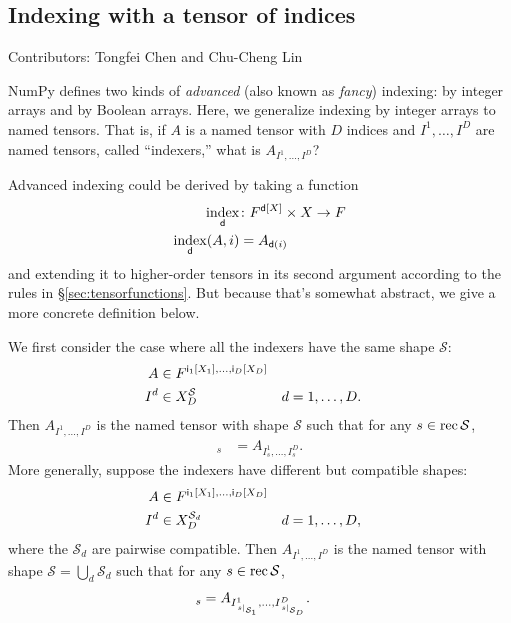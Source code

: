 \subsection{Indexing with a tensor of indices}

Contributors: Tongfei Chen and Chu-Cheng Lin

NumPy defines two kinds of \emph{advanced} (also known as \emph{fancy}) indexing: by integer arrays and by Boolean arrays. Here, we generalize indexing by integer arrays to named tensors. That is, if $A$ is a named tensor with $D$ indices and $I^1, \ldots, I^D$ are named tensors, called ``indexers,'' what is $A_{I^1, \ldots, I^D}$?

Advanced indexing could be derived by taking a function
\begin{align*}
  \nfun{d}{index} &\colon F^{\nset{d}{X}} \times X \rightarrow F \\
  \nfun{d}{index}(A, i) &= A_{\nidx{d}{i}}
\end{align*}
and extending it to higher-order tensors in its second argument according to the rules in \S\ref{sec:tensorfunctions}. But because that's somewhat abstract, we give a more concrete definition below.

We first consider the case where all the indexers have the same shape $\mathcal{S}$:
\begin{align*}
  A &\in F^{\nset{i\sub{1}}{X_1}, \ldots, \nset{i\sub{D}}{X_D}} \\
  I^d &\in X_D^{\mathcal{S}} & d &= 1, \ldots, D.
\end{align*}
Then $A_{I^1, \ldots, I^D}$ is the named tensor with shape $\mathcal{S}$ such that for any $s \in \rec{\mathcal{S}}$,
\begin{align*}
  [A_{I^1, \ldots, I^D}]_s &= A_{I^1_s, \ldots, I^D_s}.
\end{align*}
More generally, suppose the indexers have different but compatible shapes:
\begin{align*}
  A &\in F^{\nset{i\sub{1}}{X_1}, \ldots, \nset{i\sub{D}}{X_D}} \\
  I^d &\in X_D^{\mathcal{S}_d} & d &= 1, \ldots, D,
\end{align*}
where the $\mathcal{S}_d$ are pairwise compatible. Then $A_{I^1, \ldots, I^D}$ is the named tensor with shape $\mathcal{S} = \bigcup_d \mathcal{S}_d$ such that for any $s \in \rec{\mathcal{S}}$,
\begin{align*}
  [A_{I^1, \ldots, I^D}]_s &= A_{I^1_{\restrict{s}{\mathcal{S}_1}}, \ldots, I^D_{\restrict{s}{\mathcal{S}_D}}}.
\end{align*}

